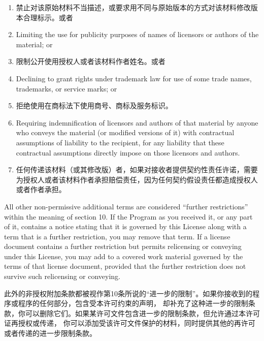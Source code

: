 \documentclass[11pt]{article}
\begin{document}
\begin{enumerate}
\begin{enumerate}
          \item 禁止对该原始材料不当描述，或要求用不同与原始版本的方式对该材料修改版本合理标示。或者

          \item Limiting the use for publicity purposes of names of licensors or
                authors of the material; or

          \item 限制公开使用授权人或者该材料作者姓名。或者

          \item Declining to grant rights under trademark law for use of some
                trade names, trademarks, or service marks; or

          \item 拒绝使用在商标法下使用商号、商标及服务标识。

          \item Requiring indemnification of licensors and authors of that
                material by anyone who conveys the material (or modified versions of
                it) with contractual assumptions of liability to the recipient, for
                any liability that these contractual assumptions directly impose on
                those licensors and authors.

          \item 任何传递该材料（或其修改版）者，如果对接收者提供契约性责任许诺，需要为授权人或者该材料作者承担赔偿责任，因为任何契约假设责任都造成授权人或者作者承担。

        \end{enumerate}

        All other non-permissive additional terms are considered ``further
        restrictions'' within the meaning of section 10.  If the Program as you
        received it, or any part of it, contains a notice stating that it is
        governed by this License along with a term that is a further
        restriction, you may remove that term.  If a license document contains
        a further restriction but permits relicensing or conveying under this
        License, you may add to a covered work material governed by the terms
        of that license document, provided that the further restriction does
        not survive such relicensing or conveying.

        此外的非授权附加条款都被视作第10条所说的“进一步的限制”。如果你接收到的程序或程序的任何部分，包含受本许可约束的声明，
        却补充了这种进一步的限制条款，你可以删除它们。如果某许可文件包含进一步的限制条款，但允许通过本许可证再授权或传递，
        你可以添加受该许可文件保护的材料，同时提供其他的再许可或者传递的进一步限制条款。


\end{enumerate}
\end{document}
